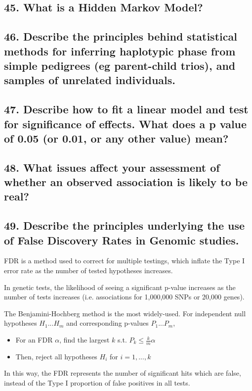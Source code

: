 \documentclass{tufte-handout}
\theoremstyle{noparens}
\begin{document}
\newpage
\subsection{45. What is a Hidden Markov Model?}

\newpage
\subsection{46. Describe the principles behind statistical methods for inferring haplotypic phase from simple pedigrees (eg parent-child trios), and samples of unrelated individuals.} 

\newpage
\subsection{47. Describe how to fit a linear model and test for significance of effects. What does a p value of 0.05 (or 0.01, or any other value) mean?} 

\newpage
\subsection{48. What issues affect your assessment of whether an observed association is likely to be real?}

\newpage
\subsection{49. Describe the principles underlying the use of False Discovery Rates in Genomic studies.}

FDR is a method used to correct for multiple testings, which inflate the Type I error rate as the number of tested hypotheses increases.

In genetic tests, the likelihood of seeing a significant p-value increases as the number of tests increases (i.e. associations for 1,000,000 SNPs or 20,000 genes).

The Benjamini-Hochberg method is the most widely-used. For independent null hypotheses $H_1 ... H_m$ and corresponding p-values $P_1 ... P_m$,

\begin{itemize}
	\item For an FDR $\alpha$, find the largest $k$ s.t. $P_k \leq \frac{k}{m}\alpha$
	\item Then, reject all hypotheses $H_i$ for $i = 1,...,k$
\end{itemize}

In this way, the FDR represents the number of significant hits which are false, instead of the Type I proportion of false positives in all tests.
\end{document}
